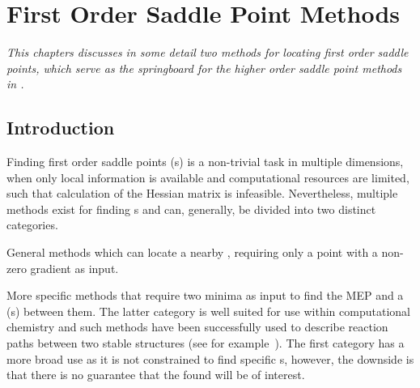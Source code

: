 \chapter{First Order Saddle Point Methods}
\label{chap:saddle-point-methods}
\textit{This chapters discusses in some detail two methods for locating first order saddle points, which serve as the springboard for the higher order saddle point methods in .}
\section{Introduction}
Finding first order saddle points (s) is a non-trivial task in multiple dimensions, when only local information is available and computational resources are limited, such that calculation of the Hessian matrix is infeasible.
Nevertheless, multiple methods exist for finding s and can, generally, be divided into two distinct categories.
\item General methods which can locate a nearby , requiring only a point with a non-zero gradient as input.
\item More specific methods that require two minima as input to find the MEP and a  (s) between them.
\een
The latter category is well suited for use within computational chemistry and such methods have been successfully used to describe reaction paths between two stable structures (see for example~\cite{double-defect-2011}).
The first category has a more broad use as it is not constrained to find specific s, however, the downside is that there is no guarantee that the found  will be of interest.





